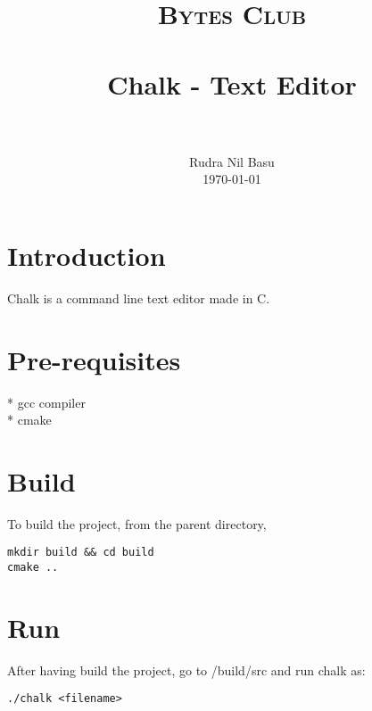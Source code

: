 \documentclass[paper=a4, fontsize=11pt]{scrartcl}
\title{
		\usefont{OT1}{bch}{b}{n}
		\normalfont \normalsize \textsc{Bytes Club} \\ [25pt]
		\horrule{0.5pt} \\[0.4cm]
		\huge Chalk - Text Editor\\
		\horrule{2pt} \\[0.5cm]
}
\author{
		\normalfont 								\normalsize
        Rudra Nil Basu\\[-3pt]		\normalsize
        \today
}
\date{}
\numberwithin{equation}{section}		%
\numberwithin{figure}{section}			%
\numberwithin{table}{section}				%
\begin{document}
\maketitle
\section{Introduction}
Chalk is a command line text editor made in C.

\section{Pre-requisites}
* gcc compiler\\
* cmake\\

\section{Build}
To build the project, from the parent directory,

\begin{lstlisting}
mkdir build && cd build
cmake ..
\end{lstlisting}

\section{Run}
After having build the project, go to /build/src and run chalk as:

\begin{lstlisting}
./chalk <filename>
\end{lstlisting}

\end{document}
